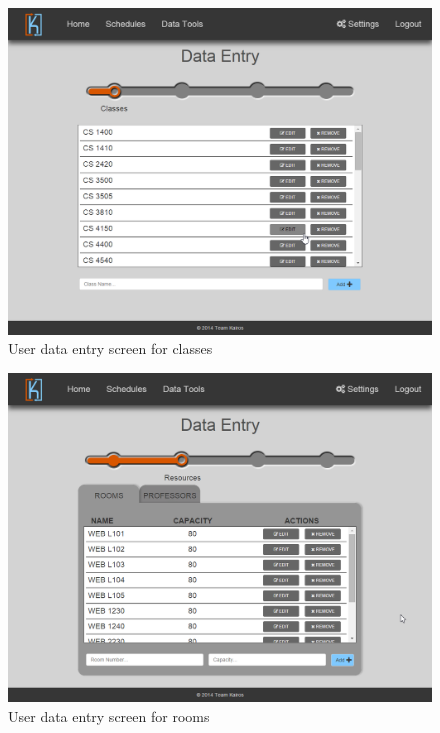 \documentclass{extarticle}
\begin{document}
\begin{appendices}
\begin{figure}[!ht]
    \centering
    \includegraphics[width=1.0\textwidth]{img/data-entry-classes}
    \caption{User data entry screen for classes}
    \label{fig:data-entry-classes}
\end{figure}

\begin{figure}[!ht]
    \centering
    \includegraphics[width=1.0\textwidth]{img/data-entry-rooms}
    \caption{User data entry screen for rooms}
    \label{fig:data-entry-rooms}
\end{figure}

\clearpage{}


\end{appendices}
\end{document}
